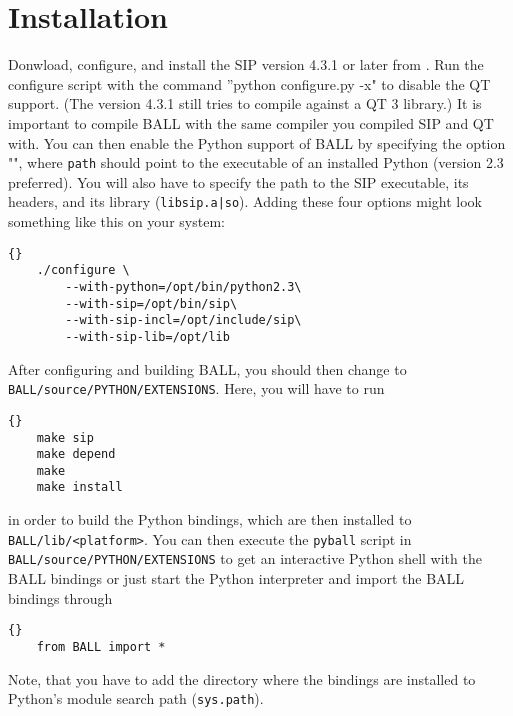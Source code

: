 \section{Installation}

Donwload, configure, and install the SIP version 4.3.1 or later from 
.
Run the configure script with the command ''python configure.py -x" to
disable the QT support. (The version 4.3.1 still tries to compile against a QT 3 library.)
It is important to compile BALL 
with the same \CPP compiler you compiled SIP and QT with. You can then enable the Python support of BALL
by specifying the option \mbox{""}, where
{\tt path} should point to the executable of an installed Python (version 2.3
preferred). You will also have to specify the path to the SIP executable, its
headers, and its library ({\tt libsip.a|so}). Adding these four options might
look something like this on your system:

\begin{lstlisting}{}
	./configure \
		--with-python=/opt/bin/python2.3\
		--with-sip=/opt/bin/sip\
		--with-sip-incl=/opt/include/sip\
		--with-sip-lib=/opt/lib
\end{lstlisting}

\noindent
After configuring and building BALL, you should then change to {\tt
BALL/source/PYTHON/EXTENSIONS}. Here, you will have to run

\begin{lstlisting}{}
	make sip
	make depend
	make
	make install
\end{lstlisting}

\noindent
in order to build the Python bindings, which are then installed to {\tt
BALL/lib/<platform>}. 
You can then execute the {\tt pyball} script in {\tt
BALL/source/PYTHON/EXTENSIONS} to get an interactive Python shell with the
BALL bindings or just start the Python interpreter and import the BALL
bindings through

\begin{lstlisting}{}
	from BALL import *
\end{lstlisting}

\noindent
Note, that you have to add the directory where the bindings are installed to
Python's module search path ({\tt sys.path}).
